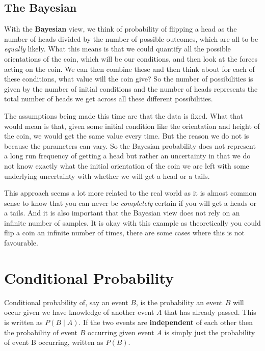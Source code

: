 \documentclass[12pt,twoside]{report}   %
\begin{document}
\subsection{The Bayesian}\label{The Bayesian}

With the \textbf{Bayesian} view, we think of probability of flipping a head as the number of heads divided by the number of possible outcomes, which are all to be \textit{equally} likely. What this means is that we could quantify all the possible orientations of the coin, which will be our  conditions, and then look at the forces acting on the coin. We can then combine these and then think about for each of these conditions, what value will the coin give? So the number of possibilities is given by the number of initial conditions and the number of heads represents the total number of heads we get across all these different possibilities.

The assumptions being made this time are that the data is fixed. What that would mean is that, given some initial condition like the orientation and height of the coin, we would get the same value every time. But the reason we do not is because the parameters can vary. So the Bayesian probability does not represent a long run frequency of getting a head but rather an uncertainty in that we do not know exactly what the initial orientation of the coin we are left with some underlying uncertainty with whether we will get a head or a tails.

This approach seems a lot more related to the real world as it is almost common sense to know that you can never be \textit{completely} certain if you will get a heads or a tails. And it is also important that the Bayesian view does not rely on an infinite number of samples. It is okay with this example as theoretically you could flip a coin an infinite number of times, there are some cases where this is not favourable.

\section{Conditional Probability}\label{Conditional Probability}

Conditional probability of, say an event $B$, is the probability an event $B$ will occur given we have knowledge of another event $A$ that has already passed. This is written as $P(B\mid A)$. If the two events are \textbf{independent} of each other then the probability of event $B$ occurring given event $A$ is simply just the probability of event B occurring, written as $P(B)$.
\end{document}
